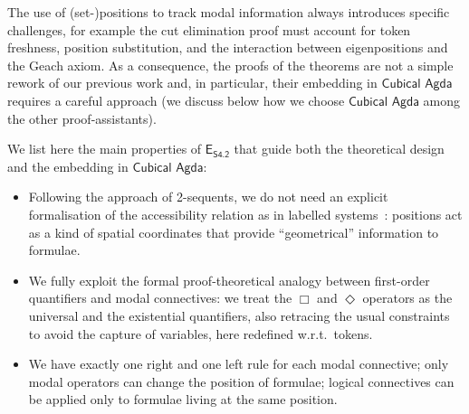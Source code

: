 \documentclass{article}
\newcommand{\logic}{\mathsf{S4.2}}
\newcommand{\axname}[1]{\mathsf{#1}}
\newcommand{\eseq}{\mathsf{E}_{{\textsf{S4.2}}}}
\newcommand{\cubical}{\textsf{Cubical Agda}}
\theoremstyle{definition}
\begin{document}

The use of (set-)positions to track modal information always introduces specific challenges, for example the cut elimination proof must account for token freshness, position substitution, and the interaction between eigenpositions and the Geach axiom. As a consequence, the proofs of the theorems are not a simple rework of our previous work and, in particular, their embedding in $\cubical$ requires a careful approach (we discuss below how we choose $\cubical$ among the other proof-assistants).

We list here the main properties of $\eseq$ that guide both the theoretical design and the embedding in $\cubical$:

\begin{itemize}
    \item

Following the approach of 2-sequents, we do not need an explicit formalisation of the accessibility relation as in labelled systems~\cite{Negri:2011, Basin1998:NonClassical}: positions act as a kind of spatial coordinates that provide ``geometrical'' information to formulae.

\item We fully exploit the formal proof-theoretical analogy between first-order quantifiers and modal connectives: we treat the $\Box$ and $\Diamond$ operators as the universal and the existential quantifiers, also retracing the usual constraints to avoid the capture of variables, here redefined w.r.t.\ tokens.
\item We have exactly one right and one left rule for each modal connective; only modal operators can change the position of formulae; logical connectives can be applied only to formulae living at the same position.

\end{itemize}
\end{document}
